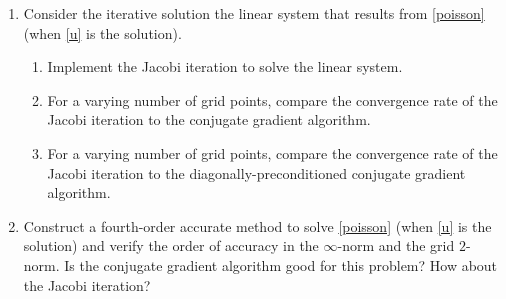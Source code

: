 \documentclass[10pt]{amsart}
\begin{document}
\begin{enumerate}[label={\bf Problem~{\arabic*}:}]
  \mline 
  \item Consider the iterative solution the linear system that results
    from \eqref{poisson} (when \eqref{u} is the solution).
    \begin{enumerate}
    \item Implement the Jacobi iteration to solve the linear system.
    \item For a varying number of grid points, compare the convergence rate of the Jacobi iteration to the
      conjugate gradient algorithm.
      \item For a varying number of grid points, compare the convergence rate of the Jacobi iteration to
        the diagonally-preconditioned conjugate gradient algorithm.
    \end{enumerate}

    \mline
    \item Construct a fourth-order accurate method to solve \eqref{poisson}
      (when \eqref{u} is the solution) and verify the order of
      accuracy in the $\infty$-norm and the grid $2$-norm.  Is the conjugate gradient algorithm good for this
      problem?  How about the Jacobi iteration?
    
  \end{enumerate}
\end{document}
